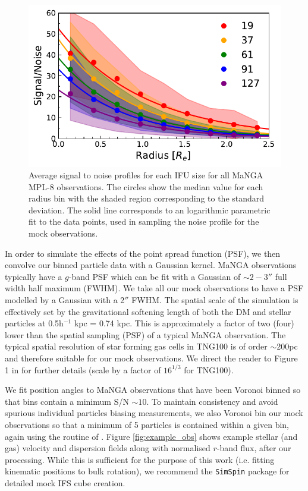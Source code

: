 \begin{figure}
    \centering
	\includegraphics[width=0.95\linewidth]{misalignment_TNG/noise_profiles_ifusize.pdf}
    \caption{Average signal to noise profiles for each IFU size for all MaNGA MPL-8 observations. The circles show the median value for each radius bin with the shaded region corresponding to the standard deviation. The solid line corresponds to an logarithmic parametric fit to the data points, used in sampling the noise profile for the mock observations.}
    \label{fig:noise_profile}
\end{figure}

In order to simulate the effects of the point spread function (PSF), we then convolve our binned particle data with a Gaussian kernel. MaNGA observations typically have a $g$-band PSF which can be fit with a Gaussian of $\sim 2-3''$ full width half maximum (FWHM). We take all our mock observations to have a PSF modelled by a Gaussian with a 2$''$ FWHM. The spatial scale of the simulation is effectively set by the gravitational softening length of both the DM and stellar particles at 0.5h$^{-1}$ kpc = 0.74 kpc. This is approximately a factor of two (four) lower than the spatial sampling (PSF) of a typical MaNGA observation. The typical spatial resolution of star forming gas cells in TNG100 is of order $\sim$200pc and therefore suitable for our mock observations. We direct the reader to Figure 1 in \citet{pillepich2019} for further details (scale by a factor of $16^{1/3}$ for TNG100).

We fit position angles to MaNGA observations that have been Voronoi binned so that bins contain a minimum S/N $\sim 10$. To maintain consistency and avoid spurious individual particles biasing measurements, we also Voronoi bin our mock observations so that a minimum of 5 particles is contained within a given bin, again using the routine of \citet{cappellari2003}. Figure \ref{fig:example_obs} shows example stellar (and gas) velocity and dispersion fields along with normalised $r$-band flux, after our processing. While this is sufficient for the purpose of this work (i.e. fitting kinematic positions to bulk rotation), we recommend the \texttt{SimSpin} package \citep{harborne2019, harborne2020} for detailed mock IFS cube creation.

